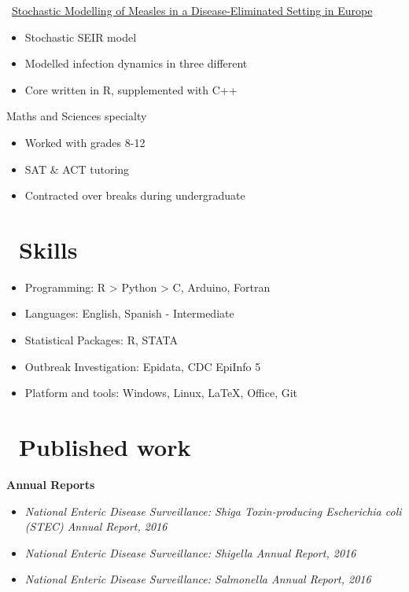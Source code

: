 \documentclass{resume}
\begin{document}
\faGithubSquare\ \href{https://github.com/beansrowning/modelling}{Stochastic Modelling of Measles in a Disease-Eliminated Setting in Europe}
\begin{itemize}
  \item Stochastic SEIR model
  \item Modelled infection dynamics in three different 
  \item Core written in R, supplemented with C++
\end{itemize}

Maths and Sciences specialty
\begin{itemize}
  \item Worked with grades 8-12
  \item SAT \& ACT tutoring
  \item Contracted over breaks during undergraduate
\end{itemize}

\section{\faCogs\ Skills}
\begin{itemize}[parsep=0.5ex]
  \item Programming: R > Python > C, Arduino, Fortran
  \item Languages: English, Spanish - Intermediate
  \item Statistical Packages: R, STATA
  \item Outbreak Investigation: Epidata, CDC EpiInfo 5
  \item Platform and tools: Windows, Linux, \LaTeX, Office, Git
\end{itemize}

\section{\faFileTextO\ Published work}

\textbf{Annual Reports}

\begin{itemize}
  \item \textit{National Enteric Disease Surveillance: Shiga Toxin-producing Escherichia coli (STEC) Annual Report, 2016}
  \item \textit{National Enteric Disease Surveillance: Shigella Annual Report, 2016}
  \item \textit{National Enteric Disease Surveillance: Salmonella Annual Report, 2016} \\
\end{itemize}
\end{document}
